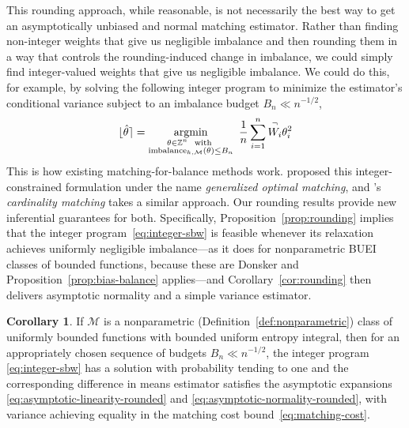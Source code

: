 \documentclass{article}
\DeclareMathOperator*{\argmin}{argmin}
\theoremstyle{definition}
\newtheorem{corollary}[theorem]{Corollary}
\DeclarePairedDelimiter\round{\lfloor}{\rceil}
\DeclareMathOperator{\imbalance}{imbalance}
\newcommand{\htheta}{\hat\theta}
\newcommand{\model}{\mathcal{M}}
\newcommand{\<}{\langle}
\renewcommand{\>}{\rangle}
\begin{document}

This rounding approach, while reasonable, is not necessarily the best way to get an asymptotically unbiased and normal matching estimator.
Rather than finding non-integer weights that give us negligible imbalance and then rounding them in a way that controls the rounding-induced change in imbalance, we could simply find integer-valued weights that give us negligible imbalance.
We could do this, for example, by solving the following integer program to minimize the estimator's conditional variance subject to an imbalance budget $B_n \ll n^{-1/2}$,
\begin{equation}
\label{eq:integer-sbw}
\round{\hat\theta} = \argmin_{\substack{\theta\in\mathbb{Z}^n \ \text{ with } \\ \imbalance_{h, \model}(\theta) \leq B_n}} \  \frac1n\sum_{i=1}^n \overset{\neg}{W_i} \theta_i^2
\end{equation}
This is how existing matching-for-balance methods work. \citet{kallus2016generalized} proposed this integer-constrained formulation under the name \emph{generalized optimal matching}, and \citet{zubizarreta2014matching}'s \emph{cardinality matching} takes a similar approach. Our rounding results provide new inferential guarantees for both. Specifically, Proposition~\ref{prop:rounding} implies that the integer program~\eqref{eq:integer-sbw} is feasible whenever its relaxation achieves uniformly negligible imbalance---as it does for nonparametric BUEI classes of bounded functions, because these are Donsker and Proposition~\ref{prop:bias-balance} applies---and Corollary~\ref{cor:rounding} then delivers asymptotic normality and a simple variance estimator.

\begin{corollary}
\label{cor:integer-sbw}
If $\model$ is a nonparametric (Definition~\ref{def:nonparametric}) class of uniformly bounded functions with bounded uniform entropy integral, then for an appropriately chosen sequence of budgets $B_n \ll n^{-1/2}$, the integer program \eqref{eq:integer-sbw} has a solution with probability tending to one and the corresponding difference in means estimator \smash{$\hat\psi^{match}=\frac{1}{N_1}\sum_{i=1}^n W_iY_i - \overset{\neg}W_i \round{\htheta}_i Y_i$} satisfies the asymptotic expansions \eqref{eq:asymptotic-linearity-rounded} and \eqref{eq:asymptotic-normality-rounded}, with variance achieving equality in the matching cost bound~\eqref{eq:matching-cost}.
\end{corollary}
\end{document}
